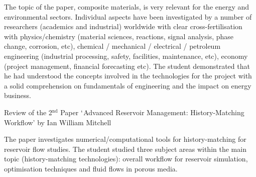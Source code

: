 \documentclass[14pt,twoside]{report}
\begin{document}
The topic of the paper, composite materials, is very relevant for the energy and environmental sectors. Individual aspects have been investigated by a number of researchers (academics and industrial) worldwide with clear cross-fertilisation with physics/chemistry (material sciences, reactions, signal analysis, phase change, corrosion, etc), chemical / mechanical / electrical / petroleum engineering (industrial processing, safety, facilities, maintenance, etc), economy (project management, financial forecasting etc). The student demonstrated that he had understood the concepts involved in the technologies for the project with a solid comprehension on fundamentals of engineering and the impact on energy business.    


\clearpage





\bigskip

\begin{center}
{\Large Review of the 2$^{\text{nd}}$ Paper $\lq$Advanced Reservoir Management: History-Matching Workflow' by Ian William Mitchell}
\end{center}

\medskip

The paper investigates numerical/computational tools for history-matching for reservoir flow studies. The student studied three subject areas within the main topic (history-matching technologies): overall workflow for reservoir simulation, optimisation techniques and fluid flows in porous media.
\end{document}

